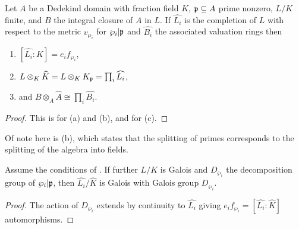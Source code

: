 \begin{proposition}\label{prop: degree and splitting of completions}
  Let $A$ be a Dedekind domain with fraction field $K$, $\mathfrak{p}\subseteq A$ prime nonzero, $L/K$ finite, and $B$ the integral closure of $A$ in $L$. If $\widehat{L_{i}}$ is the completion of $L$ with respect to the metric $v_{\wp_{i}}$ for $\wp_{i}|\mathfrak{p}$ and $\widehat{B_{i}}$ the associated valuation rings then 
  \begin{enumerate}[label=(\alph*)]
    \item $[\widehat{L_{i}}:K]=e_{i}f_{\wp_{i}}$, 
    \item $L\otimes_{K}\widehat{K}=L\otimes_{K} K_{\mathfrak{p}}=\prod_{i}\widehat{L_{i}}$, 
    \item and $B\otimes_{A}\widehat{A}\cong\prod_{i}\widehat{B_{i}}$. 
  \end{enumerate}
\end{proposition}
\begin{proof}
  This is \cite[Ch. 2, \S 3, Thm. 1]{Serre} for (a) and (b), and \cite[Ch. 2, \S 3, Prop. 4]{Serre} for (c). 
\end{proof}
Of note here is (b), which states that the splitting of primes corresponds to the splitting of the algebra into fields. 
\begin{corollary}
  Assume the conditions of . If further $L/K$ is Galois and $D_{\wp_{i}}$ the decomposition group of $\wp_{i}|\mathfrak{p}$, then $\widehat{L_{i}}/\widehat{K}$ is Galois with Galois group $D_{\wp_{i}}$. 
\end{corollary}
\begin{proof}
  The action of $D_{\wp_{i}}$ extends by continuity to $\widehat{L_{i}}$ giving $e_{i}f_{\wp_{i}}=[\widehat{L_{i}}:\widehat{K}]$ automorphisms. 
\end{proof}
